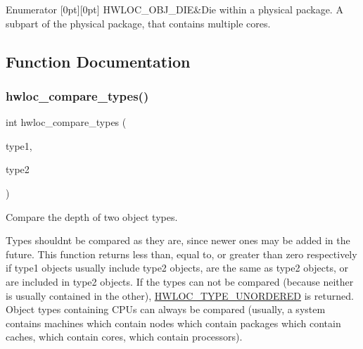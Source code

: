 \begin{DoxyEnumFields}{Enumerator}
[0pt][0pt]{}\mbox{\label{a00184_ggacd37bb612667dc437d66bfb175a8dc55af78bb6cde53aaaaa162a7dc420c409da}} 
H\+W\+L\+O\+C\+\_\+\+O\+B\+J\+\_\+\+D\+IE&Die within a physical package. A subpart of the physical package, that contains multiple cores. \\
\hline

\end{DoxyEnumFields}


\subsection{Function Documentation}
\mbox{\label{a00184_ga1820ea0dfd8e9dca28f9ea7624df5ae2}} 
\subsubsection{\texorpdfstring{hwloc\+\_\+compare\+\_\+types()}{hwloc\_compare\_types()}}
{\footnotesize\ttfamily int hwloc\+\_\+compare\+\_\+types (\begin{DoxyParamCaption}\item[{\hyperlink{a00184_gacd37bb612667dc437d66bfb175a8dc55}{hwloc\+\_\+obj\+\_\+type\+\_\+t}}]{type1,  }\item[{\hyperlink{a00184_gacd37bb612667dc437d66bfb175a8dc55}{hwloc\+\_\+obj\+\_\+type\+\_\+t}}]{type2 }\end{DoxyParamCaption})}



Compare the depth of two object types. 

Types shouldn\textquotesingle{}t be compared as they are, since newer ones may be added in the future. This function returns less than, equal to, or greater than zero respectively if {\ttfamily type1} objects usually include {\ttfamily type2} objects, are the same as {\ttfamily type2} objects, or are included in {\ttfamily type2} objects. If the types can not be compared (because neither is usually contained in the other), \hyperlink{a00184_ga3b6e4128e9fe773863b123fa6e4a080b}{H\+W\+L\+O\+C\+\_\+\+T\+Y\+P\+E\+\_\+\+U\+N\+O\+R\+D\+E\+R\+ED} is returned. Object types containing C\+P\+Us can always be compared (usually, a system contains machines which contain nodes which contain packages which contain caches, which contain cores, which contain processors).

